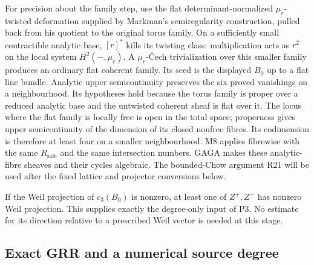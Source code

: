 \documentclass[11pt,a4paper]{article}
\theoremstyle{definition}\newtheorem{definition}[theorem]{Definition}
\theoremstyle{remark}\newtheorem{remark}[theorem]{Remark}
\begin{document}
For precision about the family step, use the flat determinant-normalized
$\mu_r$-twisted deformation supplied by Markman's semiregularity
construction, pulled back from his quotient to the original torus
family. On a sufficiently small contractible analytic base,
$[r]^*$ kills its twisting class: multiplication acts as $r^2$ on
the local system $H^2(-,\mu_r)$. A $\mu_r$-\v Cech trivialization
over this smaller family produces an ordinary flat coherent family.
Its seed is the displayed $B_0$ up to a flat line bundle.
Analytic upper semicontinuity
\citep[\S7, Satz~3, pp.~62--63]{Grauert60}
preserves the six proved vanishings on a neighbourhood. Its
hypotheses hold because the torus family is proper over a reduced
analytic base and the untwisted coherent sheaf is flat over it.
The locus where the flat family is locally free is
open in the total space; properness gives upper semicontinuity of
the dimension of its closed nonfree fibres. Its codimension is
therefore at least four on a smaller neighbourhood.
M8 applies fibrewise with the same $R_{\mathrm{safe}}$ and the same
intersection numbers. GAGA makes these analytic-fibre sheaves and
their cycles algebraic. The bounded-Chow argument R21 will be used
after the fixed lattice and projector conversions below.

If the Weil projection of $c_3(B_0)$ is nonzero, at least one of
$Z^+,Z^-$ has nonzero Weil projection. This supplies exactly the
degree-only input of P3. No estimate for its direction relative to
a prescribed Weil vector is needed at this stage.

\subsection{Exact GRR and a numerical source degree}
\end{document}
